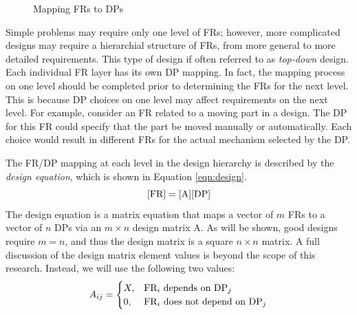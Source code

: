 \begin{figure}[h]
  \label{fig:mapping}
  \begin{center}
  \end{center}
  \caption{Mapping FRs to DPs}
\end{figure}

Simple problems may require only one level of FRs; however, more complicated designs may require a hierarchial
structure of FRs, from more general to more detailed requirements.  This type of design if often referred to as
\emph{top-down} design.  Each individual FR layer has its own DP mapping.  In fact, the mapping process on one
level should be completed prior to determining the FRs for the next level.  This is because DP choices on one level
may affect requirements on the next level.  For example, consider an FR related to a moving part in a design.  The
DP for this FR could specify that the part be moved manually or automatically.  Each choice would result in
different FRs for the actual mechanism selected by the DP.

The FR/DP mapping at each level in the design hierarchy is described by the \emph{design equation}, which is shown
in Equation \ref{eqn:design}.
\begin{equation}
  \label{eqn:design}
  [\text{FR}]=[\text{A}][\text{DP}]
\end{equation}
The design equation is a matrix equation that maps a vector of \(m\) FRs to a vector of \(n\) DPs via an \(m\times
n\) design matrix A.  As will be shown, good designs require \(m=n\), and thus the design matrix is a square
\(n\times n\) matrix.  A full discussion of the design matrix element values is beyond the scope of this research.
Instead, we will use the following two values:
\[A_{ij}=\begin{cases}
X, & \text{FR}_i\ \text{depends on}\ \text{DP}_j \\
0, & \text{FR}_i\ \text{does not depend on}\ \text{DP}_j
\end{cases}\]

